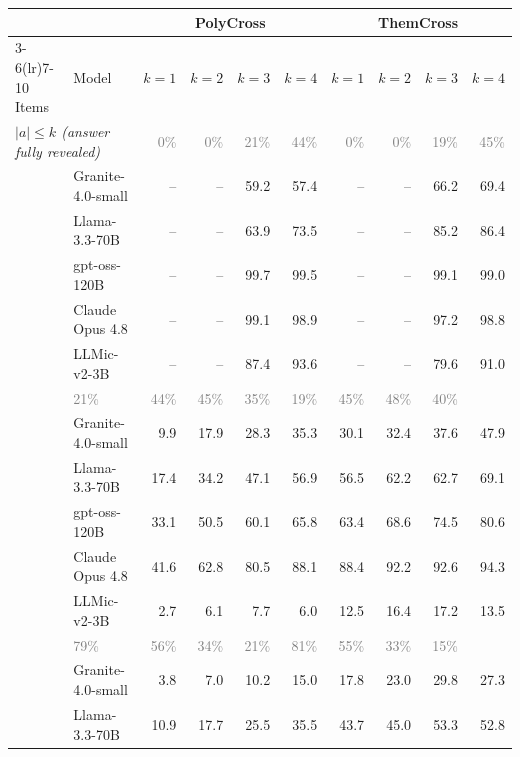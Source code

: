 \begin{tabular}{llrrrrrrrr}
\toprule
 & & \multicolumn{4}{c}{PolyCross} & \multicolumn{4}{c}{ThemCross} \\
\cmidrule(lr){3-6}\cmidrule(lr){7-10}
Items & Model & $k{=}1$ & $k{=}2$ & $k{=}3$ & $k{=}4$ & $k{=}1$ & $k{=}2$ & $k{=}3$ & $k{=}4$ \\
\midrule
\multicolumn{2}{l}{\textit{$|a| \le k$ (answer fully revealed)}} & \textcolor{gray}{0\%} & \textcolor{gray}{0\%} & \textcolor{gray}{21\%} & \textcolor{gray}{44\%} & \textcolor{gray}{0\%} & \textcolor{gray}{0\%} & \textcolor{gray}{19\%} & \textcolor{gray}{45\%} \\
 & Granite-4.0-small & -- & -- & 59.2 & 57.4 & -- & -- & 66.2 & 69.4 \\
 & Llama-3.3-70B & -- & -- & 63.9 & 73.5 & -- & -- & 85.2 & 86.4 \\
 & gpt-oss-120B & -- & -- & 99.7 & 99.5 & -- & -- & 99.1 & 99.0 \\
 & Claude Opus 4.8 & -- & -- & 99.1 & 98.9 & -- & -- & 97.2 & 98.8 \\
 & LLMic-v2-3B & -- & -- & 87.4 & 93.6 & -- & -- & 79.6 & 91.0 \\
\addlinespace
\multicolumn{2}{l}{\textit{$|a|-k \in \{1,2\}$}} & \textcolor{gray}{21\%} & \textcolor{gray}{44\%} & \textcolor{gray}{45\%} & \textcolor{gray}{35\%} & \textcolor{gray}{19\%} & \textcolor{gray}{45\%} & \textcolor{gray}{48\%} & \textcolor{gray}{40\%} \\
 & Granite-4.0-small & 9.9 & 17.9 & 28.3 & 35.3 & 30.1 & 32.4 & 37.6 & 47.9 \\
 & Llama-3.3-70B & 17.4 & 34.2 & 47.1 & 56.9 & 56.5 & 62.2 & 62.7 & 69.1 \\
 & gpt-oss-120B & 33.1 & 50.5 & 60.1 & 65.8 & 63.4 & 68.6 & 74.5 & 80.6 \\
 & Claude Opus 4.8 & 41.6 & 62.8 & 80.5 & 88.1 & 88.4 & 92.2 & 92.6 & 94.3 \\
 & LLMic-v2-3B & 2.7 & 6.1 & 7.7 & 6.0 & 12.5 & 16.4 & 17.2 & 13.5 \\
\addlinespace
\multicolumn{2}{l}{\textit{$|a|-k \ge 3$}} & \textcolor{gray}{79\%} & \textcolor{gray}{56\%} & \textcolor{gray}{34\%} & \textcolor{gray}{21\%} & \textcolor{gray}{81\%} & \textcolor{gray}{55\%} & \textcolor{gray}{33\%} & \textcolor{gray}{15\%} \\
 & Granite-4.0-small & 3.8 & 7.0 & 10.2 & 15.0 & 17.8 & 23.0 & 29.8 & 27.3 \\
 & Llama-3.3-70B & 10.9 & 17.7 & 25.5 & 35.5 & 43.7 & 45.0 & 53.3 & 52.8 \\

\end{tabular}

